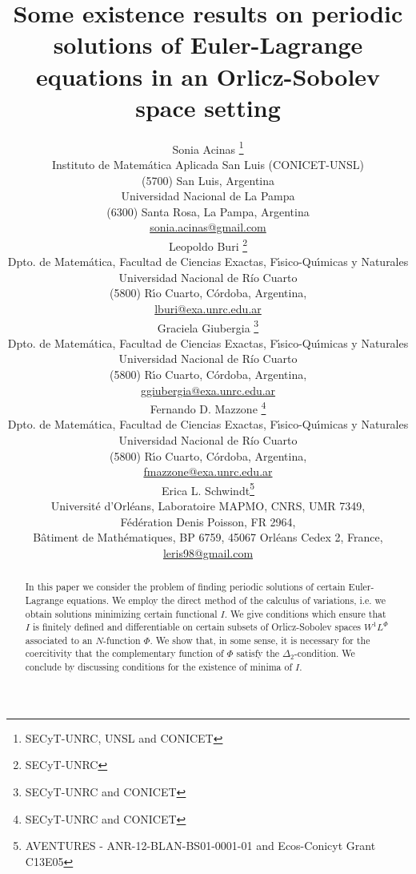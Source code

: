 \documentclass[twoside]{elsarticle}
\title{Some existence results on periodic solutions of 
Euler-Lagrange equations in an Orlicz-Sobolev space setting}
\author{Sonia Acinas \thanks{SECyT-UNRC, UNSL and CONICET}\\
Instituto de Matem\'atica Aplicada San Luis (CONICET-UNSL)\\
(5700) San Luis, Argentina\\
Universidad Nacional de La Pampa\\
(6300) Santa Rosa, La Pampa, Argentina\\
\url{sonia.acinas@gmail.com}\\[3mm]
Leopoldo Buri \thanks{SECyT-UNRC}\\
Dpto. de Matem\'atica, Facultad de Ciencias Exactas, F\'{\i}sico-Qu\'{\i}micas y Naturales\\
Universidad Nacional de R\'{i}o Cuarto\\
(5800) R\'{\i}o Cuarto, C\'ordoba, Argentina,\\
\url{lburi@exa.unrc.edu.ar}\\[3mm]
Graciela Giubergia \thanks{SECyT-UNRC and CONICET}\\
Dpto. de Matem\'atica, Facultad de Ciencias Exactas, F\'{\i}sico-Qu\'{\i}micas y Naturales\\
Universidad Nacional de R\'{i}o Cuarto\\
(5800) R\'{\i}o Cuarto, C\'ordoba, Argentina,\\
\url{ggiubergia@exa.unrc.edu.ar}\\[3mm]
Fernando D. Mazzone \thanks{SECyT-UNRC and CONICET}\\
Dpto. de Matem\'atica, Facultad de Ciencias Exactas, F\'{\i}sico-Qu\'{\i}micas y Naturales\\
Universidad Nacional de R\'{i}o Cuarto\\
(5800) R\'{\i}o Cuarto, C\'ordoba, Argentina,\\
\url{fmazzone@exa.unrc.edu.ar}\\[3mm]
Erica L. Schwindt\thanks{AVENTURES - ANR-12-BLAN-BS01-0001-01 and Ecos-Conicyt Grant C13E05}\\
Universit\'{e} d'{O}rl\'{e}ans, Laboratoire MAPMO, CNRS, UMR 7349, \\
F\'ed\'eration Denis Poisson, FR 2964,\\
B\^{a}timent de Math\'{e}matiques, BP 6759, 45067 Orl\'{e}ans Cedex 2, France,\\
\url{leris98@gmail.com}}
\date{}
\theoremstyle{remark}
\begin{document}
\maketitle
%
\begingroup%
    \renewcommand{\thefootnote}{}%
    \endgroup
%
%
%
%

\begin{abstract}
In this paper we consider the problem of finding periodic solutions of certain Euler-Lagrange equations. We employ the direct method of the calculus of variations, i.e. we obtain solutions minimizing certain functional $I$. We give conditions which ensure that $I$ is finitely defined and differentiable on certain subsets of  Orlicz-Sobolev spaces $W^1L^{\Phi}$ associated to an $N$-function $\Phi$. We show that, in some sense, it is necessary for the coercitivity that  the complementary function of $\Phi$ satisfy the $\Delta_2$-condition.  We conclude by discussing conditions for the existence of minima of $I$. 
\end{abstract}




\pagestyle{fancy} \headheight 35pt \fancyhead{} \fancyfoot{}

\fancyfoot[C]{\thepage}  \fancyhead[CO]{\nouppercase{\section}}

\fancyhead[CO]{\nouppercase{\leftmark}}


\end{document}
